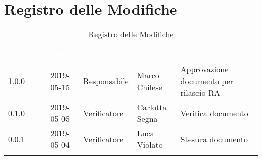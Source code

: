 \newpage

\section*{Registro delle Modifiche}

\begin{center}
\begin{longtable}[c]{|m{}|m{}|m{}|m{}|p{}|}
\hline
\rowcolor{bluelogo}\textbf{\textcolor{white}{Versione}} & \textbf{\textcolor{white}{Data}} & \textbf{\textcolor{white}{Ruolo}} & \textbf{\textcolor{white}{Autore}} & \textbf{\textcolor{white}{Descrizione}}\\
\hline \hline
\endfirsthead
1.0.0 & 2019-05-15 & Responsabile & Marco Chilese & Approvazione documento per rilascio RA  \\
\hline
\rowcolor{grigio} 0.1.0 & 2019-05-05 & Verificatore & Carlotta Segna & Verifica documento \\
\hline
0.0.1 & 2019-05-04 & Verificatore & Luca Violato & Stesura documento \\
\hline
\caption{Registro delle Modifiche}
\end{longtable}
\end{center}
